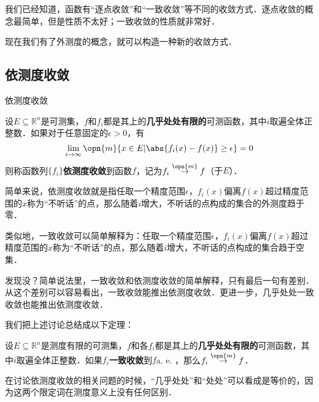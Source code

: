 

我们已经知道，函数有“逐点收敛”和“一致收敛”等不同的收敛方式．逐点收敛的概念最简单，但是性质不太好；一致收敛的性质就非常好．

现在我们有了外测度的概念，就可以构造一种新的收敛方式．

\subsection{依测度收敛}

\begin{definition}{依测度收敛}

设$E\subseteq \mathbb{R}^n$是可测集，$f$和$f_i$都是其上的\textbf{几乎处处有限的}可测函数，其中$i$取遍全体正整数．如果对于任意固定的$\epsilon>0$，有
\begin{equation}
\lim\limits_{i\to\infty}\opn{m}\{x\in E|\abs{f_i(x)-f(x)}\geq\epsilon\}=0
\end{equation}
则称函数列$\{f_i\}$\textbf{依测度收敛}到函数$f$，记为$f_i\overset{\opn{m}}\to f$（于$E$）．

\end{definition}

简单来说，依测度收敛就是指任取一个精度范围$\epsilon$，$f_i(x)$偏离$f(x)$超过精度范围的$x$称为“不听话”的点，那么随着$i$增大，不听话的点构成的集合的外测度趋于零．

类似地，一致收敛可以简单解释为：任取一个精度范围$\epsilon$，$f_i(x)$偏离$f(x)$超过精度范围的$x$称为“不听话”的点，那么随着$i$增大，不听话的点构成的集合趋于空集．

发现没？简单说法里，一致收敛和依测度收敛的简单解释，只有最后一句有差别．从这个差别可以容易看出，一致收敛能推出依测度收敛．更进一步，几乎处处一致收敛也能推出依测度收敛．

我们把上述讨论总结成以下定理：



\begin{theorem}{}\label{LimMs_the2}

设$E\subseteq \mathbb{R}^n$是测度有限的可测集，$f$和各$f_i$都是其上的\textbf{几乎处处有限的}可测函数，其中$i$取遍全体正整数．如果$f_i$\textbf{一致收敛}到$f$a. e.  ，那么$f_i\overset{\opn{m}}\to f$．

\end{theorem}



在讨论依测度收敛的相关问题的时候，“几乎处处”和“处处”可以看成是等价的，因为这两个限定词在测度意义上没有任何区别．

